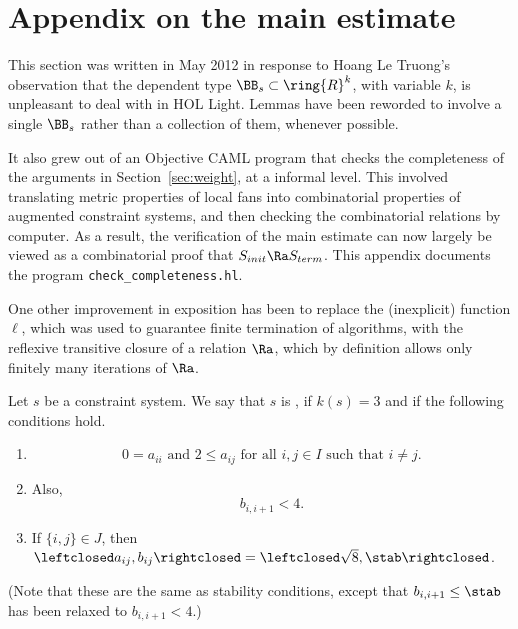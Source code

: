 

\newpage
\section{Appendix on the main estimate}\label{sec:sup-local-fan}

This section was written in May 2012 in response to Hoang Le Truong's observation that the dependent type $\BB_s\subset \ring{R}^k$, with variable $k$, is unpleasant to deal with in HOL Light.  Lemmas have been reworded to involve a single $\BB_s$
rather than a collection of them, whenever possible.

 It also grew out of an Objective CAML program that checks the completeness of the arguments in Section~\ref{sec:weight}, at a informal level.  This involved translating metric properties of local fans into combinatorial
properties of augmented constraint systems, and then checking the combinatorial
relations by computer.  As a result, the verification of the main estimate
can now largely be viewed as a combinatorial proof that $S_{init}\Ra S_{term}$.
This appendix documents the program \verb!check_completeness.hl!.

One other improvement in exposition has been to replace the (inexplicit)
function $\ell$, which was used to guarantee finite termination of algorithms,
with the reflexive transitive closure of a relation $\Ra$, which by definition
allows only finitely many iterations of $\Ra$.

\begin{definition}
Let $s$ be a constraint system.  We say that $s$ is , if $k(s)=3$
and if the
following conditions hold.
\begin{enumerate}
\item 
\[
0 = a_{ii}\text{ and }2\le a_{ij} \text{ for all }  i,j\in I \text{ such that } i\ne j.
\]  
\item
  Also, 
\[
  b_{i,i+1} < 4.
\]  
\item
If $\{i,j\}\in J$, then $\leftclosed
  a_{ij},b_{ij}\rightclosed=\leftclosed\sqrt{8},\stab\rightclosed$.
\end{enumerate}
(Note that these are the same as stability conditions, except that
$b_{i,i+1}\le \stab$ has been relaxed to $b_{i,i+1}<4$.)
\end{definition}

